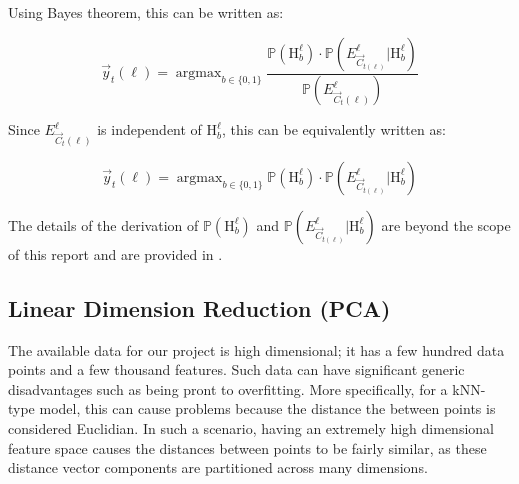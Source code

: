 \documentclass[11pt]{article}
\DeclareMathOperator*{\argmax}{argmax} %
\begin{document}
Using Bayes theorem, this can be written as:

\begin{equation}
\vec{y}_t(\ell) = \argmax_{b \in \{0,1\}} \frac{\mathbb{P}\left(\textrm{H}_b^\ell\right) \cdot \mathbb{P}\left(E_{\vec{C}_{t(\ell)}}^\ell | \textrm{H}_b^\ell\right)}{\mathbb{P}\left(E_{\vec{C}_t(\ell)}^\ell \right)} 
\end{equation}

Since $E_{\vec{C}_t(\ell)}^\ell$ is independent of $\textrm{H}_b^\ell$, this can be equivalently written as: 

\begin{equation}
\vec{y}_t(\ell) = \argmax_{b \in \{0, 1\}}\mathbb{P}\left(\textrm{H}_b^\ell\right) \cdot \mathbb{P}\left(E_{\vec{C}_{t(\ell)}}^\ell | \textrm{H}_b^\ell\right)
\end{equation}

The details of the derivation of $\mathbb{P}\left(\textrm{H}_b^\ell\right)$ and $\mathbb{P}\left(E_{\vec{C}_{t(\ell)}}^\ell | \textrm{H}_b^\ell\right)$ are beyond the scope of this report and are provided in \autocite{ZhangMulti-labelLazy}.

 

\subsection{Linear Dimension Reduction (PCA)}
The available data for our project is high dimensional; it has a few hundred data points and a few thousand features. Such data can have significant generic disadvantages such as being pront to overfitting. More specifically, for a kNN-type model, this can cause problems because the distance the between points is considered Euclidian. In such a scenario, having an extremely high dimensional feature space causes the distances between points to be fairly similar, as these distance vector components are partitioned across many dimensions. \autocite{nguyen2019ten} 
\end{document}
